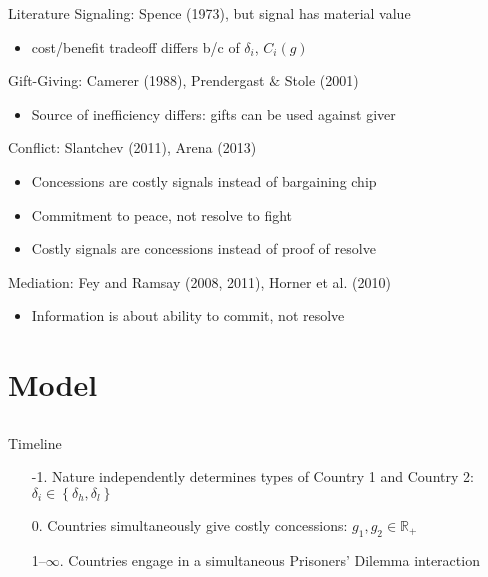 \documentclass{beamer}
\newcommand{\de}{\delta}
\begin{document}
\begin{frame}{Literature}
\pause
Signaling: Spence (1973), but signal has material value
\pause
		\begin{itemize}
			\item cost/benefit tradeoff differs b/c of $\de_i$, $C_i(g)$
		\end{itemize} 

\pause
Gift-Giving: Camerer (1988), Prendergast $\&$ Stole (2001)
\pause
		\begin{itemize}
			\item Source of inefficiency differs: gifts can be used against giver
		\end{itemize} 

\pause
Conflict: Slantchev (2011), Arena (2013)
\pause
		\begin{itemize}[<+->]
			\item Concessions are costly signals instead of bargaining chip
			\item Commitment to peace, not resolve to fight
			\item Costly signals are concessions instead of proof of resolve
		\end{itemize} 

\pause
Mediation: Fey and Ramsay (2008, 2011), Horner et al. (2010)
\pause
		\begin{itemize}
			\item Information is about ability to commit, not resolve
		\end{itemize} 
\end{frame}



\section{Model}
\subsection{}
\begin{frame}{Timeline}
\pause
\begin{enumerate}[<+->]
	\item[-1.] Nature independently determines types of Country 1 and Country 2: $\de_i \in \left\{\de_h,\de_l\right\}$
	\item[0.] Countries simultaneously give costly concessions: $g_1, g_2 \in \mathbb{R}_+$
	\item[1--$\infty$.] Countries engage in a simultaneous Prisoners' Dilemma interaction 
\end{enumerate}

\end{frame}
\end{document}
